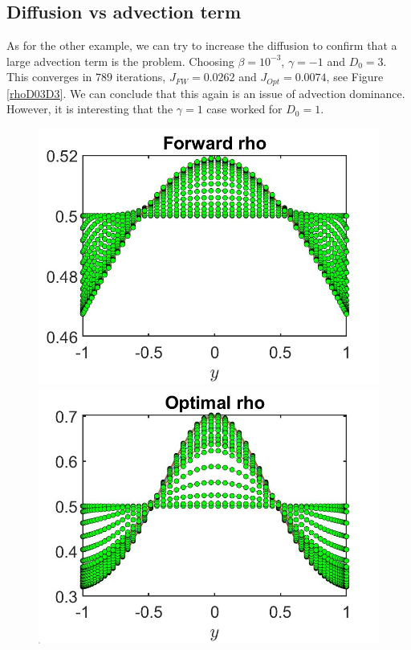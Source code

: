 \documentclass[11pt, a4paper]{article}
\theoremstyle{definition}
\begin{document}
\subsection{Diffusion vs advection term}
As for the other example, we can try to increase the diffusion to confirm that a large advection term is the problem. Choosing $\beta = 10^{-3}$, $\gamma = -1$ and $D_0 = 3$. This converges in $789$ iterations, $J_{FW} = 0.0262$ and $J_{Opt} = 0.0074$, see Figure \ref{rhoD03D3}. We can conclude that this again is an issue of advection dominance. However, it is interesting that the $\gamma = 1$ case worked for $D_0 = 1$.
	\begin{figure}[h]
		\includegraphics[scale=0.3]{rhoFW03D3.jpg}	\includegraphics[scale=0.3]{rhoOptD03D3.jpg}

\end{figure}
\end{document}
